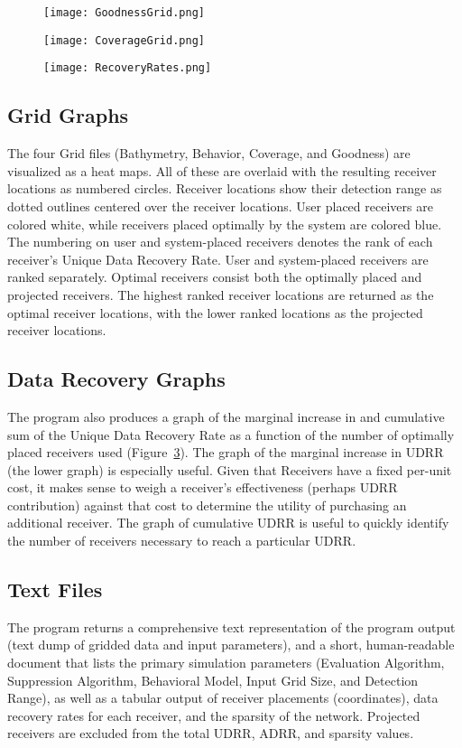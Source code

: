 	\begin{figure}[t]
		\texttt{[image: GoodnessGrid.png]}
		\caption{}\label{goodnessGraph}
	\end{figure}

	\begin{figure}[t]
		\texttt{[image: CoverageGrid.png]}
		\caption{}\label{coverageGraph}
	\end{figure}

	\begin{figure}[t]
		\texttt{[image: RecoveryRates.png]}
		\caption{}\label{recoveryGraph}
	\end{figure}
\subsection{Grid Graphs}
The four Grid files (Bathymetry, Behavior, Coverage, and Goodness) are visualized as a heat maps.  All of these are overlaid with the resulting receiver locations as numbered circles.  Receiver locations show their detection range as dotted outlines centered over the receiver locations.  User placed receivers are colored white, while receivers placed optimally by the system are colored blue.  The numbering on user and system-placed receivers denotes the rank of each receiver's Unique Data Recovery Rate.  User and system-placed receivers are ranked separately.  Optimal receivers consist both the optimally placed and projected receivers.  The highest ranked receiver locations are returned as the optimal receiver locations, with the lower ranked locations as the projected receiver locations.


\subsection{Data Recovery Graphs}
The program also produces a graph of the marginal increase in and cumulative sum of the Unique Data Recovery Rate as a function of the number of optimally placed receivers used (Figure~\ref{recoveryGraph}).  The graph of the marginal increase in UDRR (the lower graph) is especially useful.  Given that Receivers have a fixed per-unit cost, it makes sense to weigh a receiver's effectiveness (perhaps UDRR contribution) against that cost to determine the utility of purchasing an additional receiver.  The graph of cumulative UDRR is useful to quickly identify the number of receivers necessary to reach a particular UDRR.  

\subsection{Text Files}
The program returns a comprehensive text representation of the program output (text dump of gridded data and input parameters), and a short, human-readable document that lists the primary simulation parameters (Evaluation Algorithm, Suppression Algorithm, Behavioral Model, Input Grid Size, and Detection Range), as well as a tabular output of receiver placements (coordinates), data recovery rates for each receiver, and the sparsity of the network.  Projected receivers are excluded from the total UDRR, ADRR, and sparsity values.

